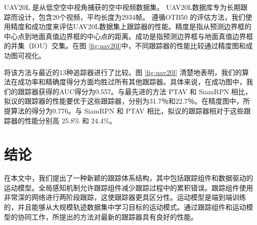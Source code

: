UAV20L \cite{mueller2016benchmark} 是从低空空中视角捕获的空中视频数据集。 UAV20L数据库专为长期跟踪而设计，包含20个视频，平均长度为2934帧。
遵循OTB50 \cite{OTB}的评估方法，我们使用精度和成功度来评估UAV20L数据集上跟踪器的性能。精度是指从预测边界框的中心点到地面真值边界框的中心点的距离。成功是指预测边界框与地面真值边界框的并集​​（IOU）交集。在图 \ref{fig:uav20l}中，不同跟踪器的性能比较通过精度图和成功图可视化。

将该方法与最近的13种追踪器进行了比较。图 \ref{fig:uav20l} 清楚地表明，我们的算法在成功率和精确度得分方面均胜过所有其他跟踪器。具体来说，在成功图中，我们的跟踪器获得的AUC得分为0.557。与最先进的方法 PTAV \cite{fan2018parallel} 和 SiamRPN \cite{SiamRPN}相比，拟议的跟踪器的性能要优于这些跟踪器，分别为31.7％和22.7％。在精度图中，所提算法的得分为0.776。与 SiamRPN \cite{SiamRPN} 和 PTAV \cite{fan2018parallel}相比，拟议的跟踪器相对于这些跟踪器的性能分别高 25.8\% 和 24.4\%。

\section{结论}
\label{sec:conclusion}

在本文中，我们提出了一种新颖的跟踪体系结构，其中包括跟踪组件和数据驱动的运动模型。全局感知机制允许跟踪组件减少跟踪过程中的累积错误。跟踪组件使用非常深的网络进行两阶段跟踪，这使跟踪器更具区分性。运动模型是端到端训练的，并且能够从大规模轨迹数据集中学习目标的运动模式。通过跟踪组件和运动模型的协同工作，所提出的方法对最新的跟踪器具有良好的性能。